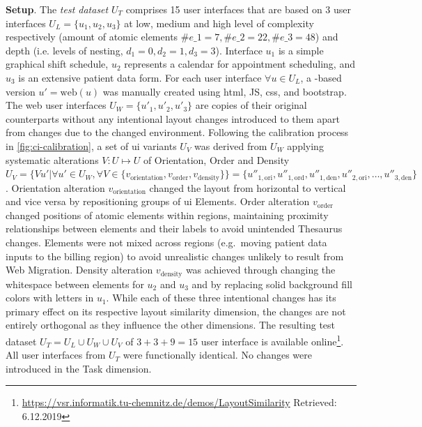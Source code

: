 \textbf{Setup}. The \emph{test dataset} \(U_T\) comprises 15 user interfaces that are based on 3  user interfaces \(U_L = \{u_1, u_2, u_3\}\) at low, medium and high level of complexity respectively (amount of atomic elements \(\#e\_1=7, \#e\_2=22,\#e\_3=48 \)) and depth (i.e. levels of nesting, \(d_1=0, d_2=1, d_3 = 3\)).
Interface \(u_1\) is a simple graphical shift schedule, \(u_2\) represents a calendar for appointment scheduling, and \(u_3\) is an extensive patient data form.
For each  user interface \(\forall u \in U_L\), a -based version \(u' = \text{web}(u)\) was manually created using \gls{html}, JS, \gls{css}, and bootstrap.
The \gls{web} user interfaces \(U_W=\{u'_1, u'_2, u'_3\}\) are copies of their original counterparts without any intentional layout changes introduced to them apart from changes due to the changed environment.
Following the calibration process in \cref{fig:ci-calibration}, a set of \gls{ui} variants \(U_V\) was derived from \(U_W\) applying systematic alterations \(V: U \mapsto U\) of Orientation, Order and Density \(U_V=\{Vu' | \forall u' \in U_W, \forall V \in \{v_{\text{orientation}}, v_{\text{order}},v_{\text{density}}\}\}=\{u''_{1,\text{ori}},u''_{1,\text{ord}},u''_{1,\text{den}}, u''_{2,\text{ori}}, \ldots, u''_{3,\text{den}}\}\).
Orientation alteration \(v_{\text{orientation}}\) changed the layout from horizontal to vertical and vice versa by repositioning groups of \gls{ui} Elements.
Order alteration \(v_{\text{order}}\) changed positions of atomic elements within regions, maintaining proximity relationships between elements and their labels to avoid unintended Thesaurus changes.
Elements were not mixed across regions (e.g.~moving patient data inputs to the billing region) to avoid unrealistic changes unlikely to result from \gls{Web Migration}.
Density alteration \(v_{{\text{density}}}\) was achieved through changing the whitespace between elements for \(u_2\) and \(u_3\) and by replacing solid background fill colors with letters in \(u_1\).
While each of these three intentional changes has its primary effect on its respective layout similarity dimension, the changes are not entirely orthogonal as they influence the other dimensions.
The resulting test dataset \(U_T = U_L \cup U_W \cup U_V\) of \(3+3+9=15\) user interface is available online\footnote{\url{https://vsr.informatik.tu-chemnitz.de/demos/LayoutSimilarity} Retrieved: 6.12.2019}.
All user interfaces from \(U_T\) were functionally identical.
No changes were introduced in the Task dimension.
